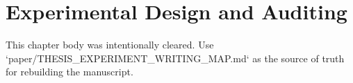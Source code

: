 \chapter{Experimental Design and Auditing}
\label{ch:experiments}

This chapter body was intentionally cleared. Use `paper/THESIS_EXPERIMENT_WRITING_MAP.md` as the source of truth for rebuilding the manuscript.
